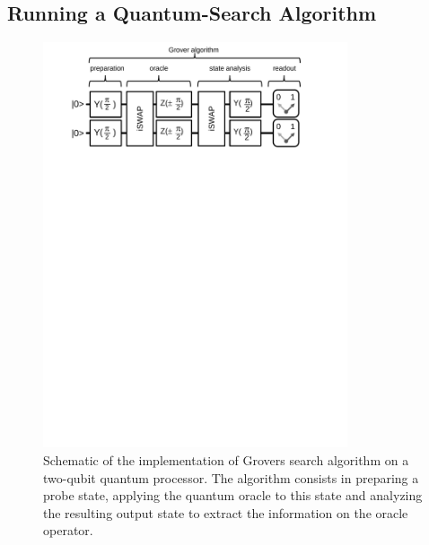 \subsection{Running a Quantum-Search Algorithm}

\begin{figure}[ht!]
	\centering
		\includegraphics[width=0.8\textwidth]{./material/papers/grover/figures/grover_algorithm_schematic}
	\caption[Schematic of the implementation of Grovers search algorithm]{Schematic of the implementation of Grovers search algorithm on a two-qubit quantum processor. The algorithm consists in preparing a probe state, applying the quantum oracle to this state and analyzing the resulting output state to extract the information on the oracle operator.} 
	\label{fig:grover_algorithm_schematic}
\end{figure}


